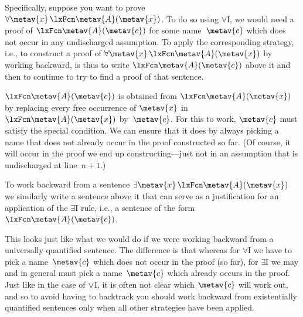 Specifically, suppose you want to prove $\forall \metav{x}\, \atom{\metav{A}}{\metav{x}}$. To do so using $\forall$I, we would need a proof of $\atom{\metav{A}}{\metav{c}}$ for some name~$\metav{c}$ which does not occur in any undischarged assumption. To apply the corresponding strategy, i.e., to construct a proof of $\forall \metav{x}\, \atom{\metav{A}}{\metav{x}}$ by working backward, is thus to write $\atom{\metav{A}}{\metav{c}}$ above it and then to continue to try to find a proof of that sentence.
\begin{fitchproof}
	\ellipsesline
\end{fitchproof}
$\atom{\metav{A}}{\metav{c}}$ is obtained from $\atom{\metav{A}}{\metav{x}}$ by replacing every free occurrence of $\metav{x}$ in $\atom{\metav{A}}{\metav{x}}$ by~$\metav{c}$. For this to work, $\metav{c}$ must satisfy the special condition. We can ensure that it does by always picking a name that does not already occur in the proof constructed so far. (Of course, it will occur in the proof we end up constructing---just not in an assumption that is undischarged at line~$n+1$.)

To work backward from a sentence $\exists \metav{x}\, \atom{\metav{A}}{\metav{x}}$ we similarly write a sentence above it that can serve as a justification for an application of the $\exists$I rule, i.e., a sentence of the form $\atom{\metav{A}}{\metav{c}}$.
\begin{fitchproof}
	\ellipsesline
\end{fitchproof}
This looks just like what we would do if we were working backward from a universally quantified sentence. The difference is that whereas for $\forall$I we have to pick a name~$\metav{c}$ which does not occur in the proof (so far), for $\exists$I we may and in general must pick a name~$\metav{c}$ which already occurs in the proof.  Just like in the case of $\vee$I, it is often not clear which $\metav{c}$ will work out, and so to avoid having to backtrack you should work backward from existentially quantified sentences only when all other strategies have been applied.

